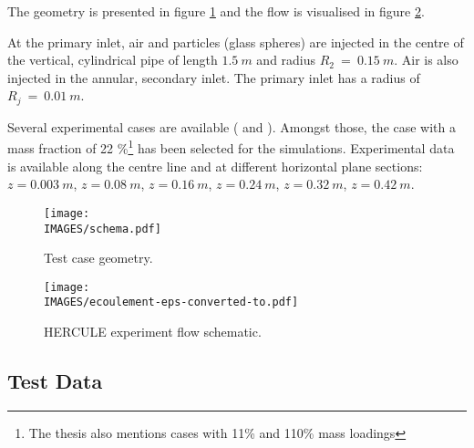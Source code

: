 The geometry is presented in figure \ref{schema} and the flow is visualised in figure \ref{ecoulement}.

\noindent
At the primary inlet, air and particles (glass spheres) are injected in the centre of the vertical, cylindrical pipe of length $1.5~m$ and radius $R_2~=~0.15~m$. Air is also injected in the annular, secondary inlet. The primary inlet has a radius of $R_j~=~0.01~m$.

\noindent
Several experimental cases are available (\cite{Rap3} and
\cite{TheseNC}). Amongst those, the case with a mass fraction of 22 \%\footnote{The thesis \cite{TheseNC} also mentions cases with 11\% and 110\% mass loadings} has been selected for the simulations. Experimental data is available along the centre line and at different horizontal plane sections: $z = 0.003~m$,
$z = 0.08~m$, $z = 0.16~m$, $z = 0.24~m$, $z = 0.32~m$, $z = 0.42~m$.


\begin{figure}[H]
   \centerline{\texttt{[image: \\IMAGES/schema.pdf]}}
   \caption{Test case geometry.}
   \label{schema}
\end{figure}

\begin{figure}[H]
   \centerline{\texttt{[image: \\IMAGES/ecoulement-eps-converted-to.pdf]}}
   \caption{HERCULE experiment flow schematic.}
   \label{ecoulement}
\end{figure}

\clearpage

\subsection{Test Data}

